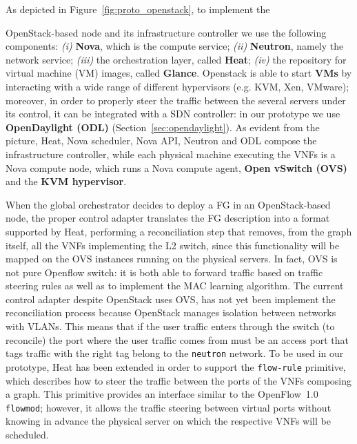 As depicted in Figure~\ref{fig:proto_openstack}, to implement the {OpenStack-based node and its infrastructure controller we use the following components: \textit{(i)} \textbf{Nova}, which is the compute service; \textit{(ii)} \textbf{Neutron}, namely the network service; \textit{(iii)} the orchestration layer, called \textbf{Heat}; \textit{(iv)} the repository for virtual machine (VM) images, called \textbf{Glance}.
Openstack is able to start \textbf{VMs} by interacting with a wide range of different hypervisors (e.g. KVM, Xen, VMware); moreover, in order to properly steer the traffic between the several servers under its control, it can be integrated with a SDN controller: in our prototype we use \textbf{OpenDaylight (ODL)} (Section~\ref{sec:opendaylight}). 
As evident from the picture, Heat, Nova scheduler, Nova API, Neutron and ODL compose the infrastructure controller, while each physical machine executing the VNFs is a Nova compute node, which runs a Nova compute agent, \textbf{Open vSwitch (OVS)}~\cite{ovswebsite} and the \textbf{KVM hypervisor}.

	
When the global orchestrator decides to deploy a FG in an OpenStack-based node, the proper control adapter translates the FG description into a format supported by Heat, performing a reconciliation step that removes, from the graph itself, all the VNFs implementing the L2 switch, since this functionality will be mapped on the OVS instances running on the physical servers. In fact, OVS is not pure Openflow switch: it is both able to forward traffic based on traffic steering rules as well as to implement the MAC learning algorithm.
The current control adapter despite OpenStack uses OVS, has not yet been implement the reconciliation process because OpenStack manages  isolation between networks with VLANs. This means that if the user traffic enters through the switch (to reconcile) the port where the user traffic comes from must be an access port that tags traffic with the right tag belong to the \texttt{neutron} network. 
To be used in our prototype, Heat has been extended in order to support the \texttt{flow-rule} primitive, which describes how to steer the traffic between the ports of the VNFs composing a graph.
This primitive provides an interface similar to the OpenFlow~1.0 \texttt{flowmod}; however, it allows the traffic steering between virtual ports without knowing in advance the physical server on which the respective VNFs will be scheduled.
	
}
